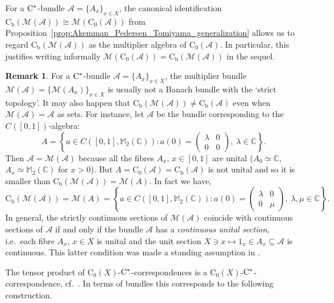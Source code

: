 \documentclass[11 pt, leqno]{amsart}
\numberwithin{equation}{section}
\theoremstyle{plain}
\theoremstyle{definition}
\newtheorem {rem} [thm]{Remark}
\newcommand{\Mat}{\mathbb M} %
\newcommand*{\contz}{\mathrm{C_0}}%
\newcommand*{\contb}{\mathrm{C_b}}%
\newcommand{\M}{\mathcal M}
\newcommand{\A}{\mathcal A}
\newcommand{\C}{\mathbb C}
\newcommand{\cst}{\ifmmode\mathrm{C}^*\else{$\mathrm{C}^*$}\fi}
\begin{document}
For a $\cst$-bundle $\A=\{A_x\}_{x\in X}$, the canonical identification $\contb(\M(\A))\cong\M(\contz(\A))$ from Proposition~\ref{prop:Akemman_Pedersen_Tomiyama_generalization}
allows us to regard $\contb(\M(\A))$ as the multiplier algebra of $\contz(\A)$. In particular, this justifies writing informally $\M(\contz(\A))=\contb(\M(\A))$ in the sequel.

\begin{rem}
For a $\cst$-bundle $\A=\{A_x\}_{x\in X}$, the multiplier bundle $\M(\A)=\{\M(A_x)\}_{x\in X}$ is usually not a Banach bundle with the `strict topology'. 
It may also happen that $\contb(\M(\A))\neq \contb(\A)$ even when $\M(\A)=\A$ as sets. 
For instance, let $\A$ be the bundle corresponding to the $C([0,1])$-algebra:
\[
    A=\left\{a\in C([0,1],\Mat_2(\C)): a(0)=\left(\begin{array}{cc} \lambda & 0 \\ 0  &  0 \end{array}\right),\ \lambda \in \C\right\}.
\] 
Then $\A=\M(\A)$ because all the fibres $A_x$, $x\in [0,1]$ are unital ($A_0\simeq\C$, $A_x\simeq \Mat_2(\C)$ for $x>0$).
But $A=\contz(\A)=\contb(\A)$ is not unital and so it is smaller than $\contb(\M(\A))=\M(A)$. In fact we have,
\[
  \contb(\M(\A))=\M(A)=\left\{a\in C([0,1],\Mat_2(\C)): a(0)=\left(\begin{array}{cc}
        \lambda & 0 \\
        0  &  \mu
        \end{array}\right),\ \lambda, \mu \in \C\right\}.
\]
In general, the strictly continuous sections of $\M(\A)$ coincide with continuous sections of $\A$ if and only if the bundle $\A$ has a \emph{continuous unital section}, i.e.\ each fibre $A_x$, $x\in X$ is unital and the unit section $X \ni x\mapsto 1_x\in A_x\subseteq \A$ is continuous.
This latter condition was made a standing assumption in \cite{BartoszKangAdam}.
\end{rem}

The tensor product of $\contz(X)$-$\cst$-correspondences is a $\contz(X)$-$\cst$-correspondence, cf.\ \cite[Proposition 4.1]{LeGall}. 
In terms of bundles this corresponds to the following construction.
\end{document}
